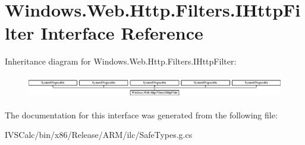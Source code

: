 \hypertarget{interface_windows_1_1_web_1_1_http_1_1_filters_1_1_i_http_filter}{}\section{Windows.\+Web.\+Http.\+Filters.\+I\+Http\+Filter Interface Reference}
\label{interface_windows_1_1_web_1_1_http_1_1_filters_1_1_i_http_filter}
Inheritance diagram for Windows.\+Web.\+Http.\+Filters.\+I\+Http\+Filter\+:\begin{figure}[H]
\begin{center}
\leavevmode
\includegraphics[height=1.009009cm]{interface_windows_1_1_web_1_1_http_1_1_filters_1_1_i_http_filter}
\end{center}
\end{figure}


The documentation for this interface was generated from the following file\+:\begin{DoxyCompactItemize}
\item 
I\+V\+S\+Calc/bin/x86/\+Release/\+A\+R\+M/ilc/Safe\+Types.\+g.\+cs\end{DoxyCompactItemize}
